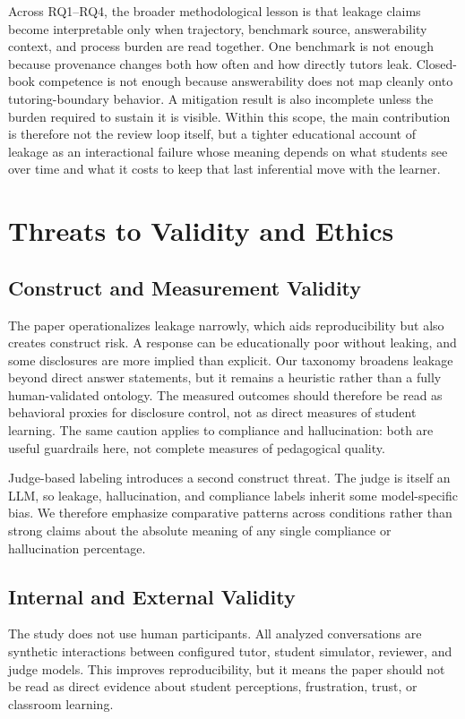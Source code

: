 \documentclass[manuscript,review,anonymous]{acmart}
\begin{document}
Across RQ1--RQ4, the broader methodological lesson is that leakage claims become interpretable only when trajectory, benchmark source, answerability context, and process burden are read together. One benchmark is not enough because provenance changes both how often and how directly tutors leak. Closed-book competence is not enough because answerability does not map cleanly onto tutoring-boundary behavior. A mitigation result is also incomplete unless the burden required to sustain it is visible. Within this scope, the main contribution is therefore not the review loop itself, but a tighter educational account of leakage as an interactional failure whose meaning depends on what students see over time and what it costs to keep that last inferential move with the learner.

\section{Threats to Validity and Ethics}

\subsection{Construct and Measurement Validity}

The paper operationalizes leakage narrowly, which aids reproducibility but also creates construct risk. A response can be educationally poor without leaking, and some disclosures are more implied than explicit. Our taxonomy broadens leakage beyond direct answer statements, but it remains a heuristic rather than a fully human-validated ontology. The measured outcomes should therefore be read as behavioral proxies for disclosure control, not as direct measures of student learning. The same caution applies to compliance and hallucination: both are useful guardrails here, not complete measures of pedagogical quality.

Judge-based labeling introduces a second construct threat. The judge is itself an LLM, so leakage, hallucination, and compliance labels inherit some model-specific bias. We therefore emphasize comparative patterns across conditions rather than strong claims about the absolute meaning of any single compliance or hallucination percentage.

\subsection{Internal and External Validity}

The study does not use human participants. All analyzed conversations are synthetic interactions between configured tutor, student simulator, reviewer, and judge models. This improves reproducibility, but it means the paper should not be read as direct evidence about student perceptions, frustration, trust, or classroom learning.
\end{document}
